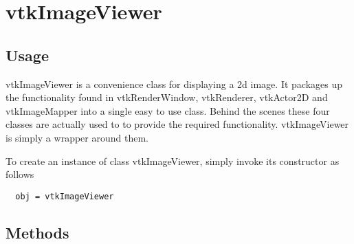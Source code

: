 \section{vtkImageViewer}

\subsection{Usage}

 vtkImageViewer is a convenience class for displaying a 2d image.  It
 packages up the functionality found in vtkRenderWindow, vtkRenderer,
 vtkActor2D and vtkImageMapper into a single easy to use class.  Behind the
 scenes these four classes are actually used to to provide the required
 functionality. vtkImageViewer is simply a wrapper around them.

To create an instance of class vtkImageViewer, simply
invoke its constructor as follows
\begin{verbatim}
  obj = vtkImageViewer
\end{verbatim}
\subsection{Methods}


